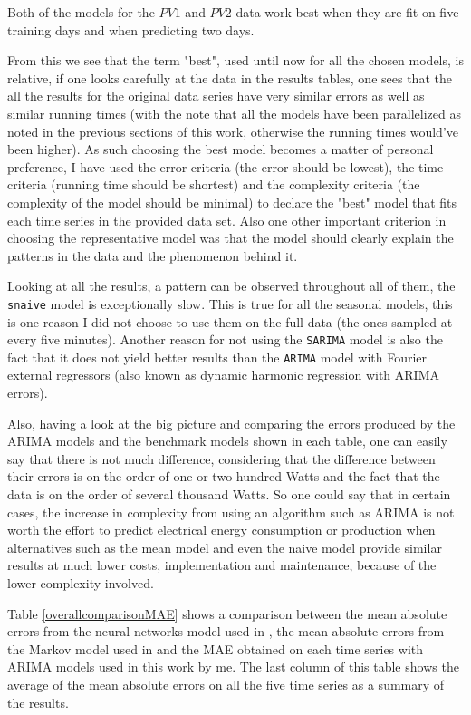 \documentclass[12pt,a4paper,titlepage]{report}
\begin{document}
Both of the models for the $ PV1 $ and $ PV2 $ data work best when they are fit on five training days and when predicting two days.

From this we see that the term "best", used until now for all the chosen models, is relative, if one looks carefully at the data in the results tables, one sees that the all the results for the original data series have very similar errors as well as similar running times (with the note that all the models have been parallelized as noted in the previous sections of this work, otherwise the running times would've been higher). As such choosing the best model becomes a matter of personal preference, I have used the error criteria (the error should be lowest), the time criteria (running time should be shortest) and the complexity criteria (the complexity of the model should be minimal) to declare the "best" model that fits each time series in the provided data set. Also one other important criterion in choosing the representative model was that the model should clearly explain the patterns in the data and the phenomenon behind it.

Looking at all the results, a pattern can be observed throughout all of them, the \texttt{snaive} model is exceptionally slow. This is true for all the seasonal models, this is one reason I did not choose to use them on the full data (the ones sampled at every five minutes). Another reason for not using the \texttt{SARIMA} model is also the fact that it does not yield better results than the \texttt{ARIMA} model with Fourier external regressors (also known as dynamic harmonic regression with ARIMA errors).

Also, having a look at the big picture and comparing the errors produced by the ARIMA models and the benchmark models shown in each table, one can easily say that there is not much difference, considering that the difference between their errors is on the order of one or two hundred Watts and the fact that the data is on the order of several thousand Watts. So one could say that in certain cases, the increase in complexity from using an algorithm such as ARIMA is not worth the effort to predict electrical energy consumption or production when alternatives such as the mean model and even the naive model provide similar results at much lower costs, implementation and maintenance, because of the lower complexity involved.

Table \ref{overallcomparisonMAE} shows a comparison between the mean absolute errors from the neural networks model used in \cite{feilmeier}, the mean absolute errors from the Markov model used in \cite{antonescu} and the MAE obtained on each time series with ARIMA models used in this work by me.
The last column of this table shows the average of the mean absolute errors on all the five time series as a summary of the results.
\end{document}
